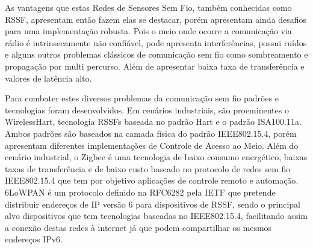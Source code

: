 As vantagens que estas Redes de Sensores Sem Fio, também conhecidas como RSSF, apresentam então fazem elas se destacar, porém apresentam ainda desafios para uma implementação robusta. Pois o meio onde ocorre a comunicação via rádio é intrinsecamente não confiável, pode apresenta interferências, possui ruídos e alguns outros problemas clássicos de comunicação sem fio como sombreamento e propagação por multi percurso. Além de apresentar baixa taxa de transferência e valores de latência alto\cite{gomes2017estimaccao}.

Para combater estes diversos problemas da comunicação sem fio padrões e tecnologias foram desenvolvidos. Em cenários industriais, são proeminentes o WirelessHart, tecnologia RSSFs baseada no padrão Hart\cite{WIHART} e o padrão ISA100.11a. Ambos padrões são baseados na camada física do padrão IEEE802.15.4, porém apresentam diferentes implementações de Controle de Acesso ao Meio\cite{gomes2017estimaccao}. Além do cenário industrial, o Zigbee é uma tecnologia de baixo consumo energético, baixas taxas de transferência e de baixo custo baseado no protocolo de redes sem fio IEEE802.15.4 que tem por objetivo aplicações de controle remoto e automação\cite{ergen2004zigbee}. 6LoWPAN é um protocolo definido na RFC6282 pela IETF que pretende distribuir endereços de IP versão 6 para dispositivos de RSSF, sendo o principal alvo dispositivos que tem tecnologias baseadas no IEEE802.15.4, facilitando assim a conexão destas redes à internet já que podem compartilhar os mesmos endereços IPv6\cite{olsson20146lowpan}. 


